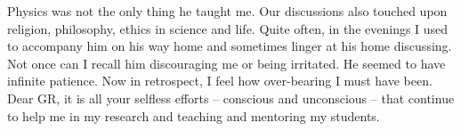 Physics was not the only thing he taught me. Our discussions also touched upon religion, philosophy, ethics in science and life. Quite often, in the evenings I used to accompany him on his way home and sometimes linger at his home discussing. Not once can I recall him discouraging me or being irritated. He seemed to have infinite patience. Now in retrospect, I feel how over-bearing I must have been. Dear GR, it is all your selfless efforts – conscious and unconscious – that continue to help me in my research and teaching and mentoring my students.



